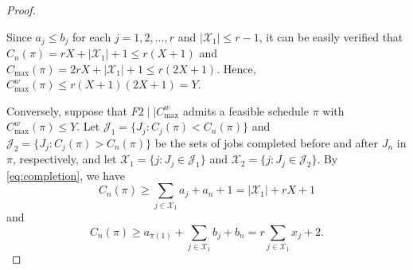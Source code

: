 \documentclass[12pt]{article}
\renewcommand{\thefigure}{\arabic{figure}}
\begin{document}
\begin{sloppypar}
\begin{proof}
\begin{figure}[H]
                \label{fig:nphard-partition}
            \end{figure}
            
            Since $a_j \leq b_j$ for each $j=1, 2, \ldots, r$ and $|\mathcal{X}_1| \leq r-1$, it can be easily verified that $C_n(\pi)=rX +|\mathcal{X}_1|+1 \leq r(X+1)$ and $C_{\max}(\pi)=2rX+|\mathcal{X}_1|+1 \leq r(2X+1)$. Hence, $C_{\max}^w(\pi) \leq r(X+1)(2X+1)= Y$.
            
            Conversely, suppose that $F2 \mid \mid C_{\max}^w$ admits a feasible schedule $\pi$ with $C_{\max}^w(\pi) \leq Y$. Let $\mathcal{J}_1=\{J_j: C_j(\pi) <C_n(\pi)\}$ and $\mathcal{J}_2=\{J_j: C_j(\pi) > C_n(\pi)\}$ be the sets of jobs completed before and after $J_n$ in $\pi$, respectively, and let $\mathcal{X}_1=\{j: J_j \in \mathcal{J}_1\}$ and $\mathcal{X}_2=\{j: J_j \in \mathcal{J}_2\}$. By \cref{eq:completion}, we have
            \begin{equation}\label{eq:completetime1}
                C_n(\pi) \geq \sum_{j \in \mathcal{X}_1} a_j +a_n+ 1=|\mathcal{X}_1| +r X + 1
            \end{equation}
            and
            \begin{equation}\label{eq:completetime2}
                C_n(\pi) \geq a_{\pi(1)}+\sum_{j \in \mathcal{X}_1} b_j+b_n = r \sum_{j \in \mathcal{X}_1} x_j + 2.
            \end{equation}
            

\end{proof}
\end{sloppypar}
\end{document}
